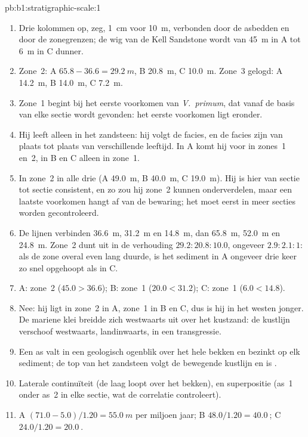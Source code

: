 \begin{solution}{pb:b1:stratigraphic-scale:1}
\begin{enumerate}
  \item Drie kolommen op, zeg, \qty{1}{cm} voor \qty{10}{m}, verbonden door de asbedden en door de zonegrenzen; de wig van de Kell Sandstone wordt van \qty{45}{m} in A tot \qty{6}{m} in C dunner.
  \item Zone~2: A $65.8 - 36.6 = \qty{29.2}{m}$, B \qty{20.8}{m}, C \qty{10.0}{m}. Zone~3 gelogd: A \qty{14.2}{m}, B \qty{14.0}{m}, C \qty{7.2}{m}.
  \item Zone~1 begint bij het eerste voorkomen van \emph{V.~primum}, dat vanaf de basis van elke sectie wordt gevonden: het eerste voorkomen ligt eronder.
  \item Hij leeft alleen in het zandsteen: hij volgt de facies, en de facies zijn van plaats tot plaats van verschillende leeftijd. In A komt hij voor in zones~1 en~2, in B en C alleen in zone~1.
  \item In zone~2 in alle drie (A \qty{49.0}{m}, B \qty{40.0}{m}, C \qty{19.0}{m}). Hij is hier van sectie tot sectie consistent, en zo zou hij zone~2 kunnen onderverdelen, maar een laatste voorkomen hangt af van de bewaring; het moet eerst in meer secties worden gecontroleerd.
  \item De lijnen verbinden \qty{36.6}{m}, \qty{31.2}{m} en \qty{14.8}{m}, dan \qty{65.8}{m}, \qty{52.0}{m} en \qty{24.8}{m}. Zone~2 dunt uit in de verhouding $29.2 : 20.8 : 10.0$, ongeveer $2.9 : 2.1 : 1$: als de zone overal even lang duurde, is het sediment in A ongeveer drie keer zo snel opgehoopt als in C.
  \item A: zone~2 ($45.0 > 36.6$); B: zone~1 ($20.0 < 31.2$); C: zone~1 ($6.0 < 14.8$).
  \item Nee: hij ligt in zone~2 in A, zone~1 in B en C, dus is hij in het westen jonger. De mariene klei breidde zich westwaarts uit over het kustzand: de kustlijn verschoof westwaarts, landinwaarts, in een transgressie.
  \item Een as valt in een geologisch ogenblik over het hele bekken en bezinkt op elk sediment; de top van het zandsteen volgt de bewegende kustlijn en is .
  \item Laterale continuïteit (de laag loopt over het bekken), en superpositie (as~1 onder as~2 in elke sectie, wat de correlatie controleert).
  \item A $(71.0 - 5.0)/1.20 = \qty{55.0}{m}$ per miljoen jaar; B $48.0/1.20 = \qty{40.0}{}$; C $24.0/1.20 = \qty{20.0}{}$.

\end{enumerate}
\end{solution}

